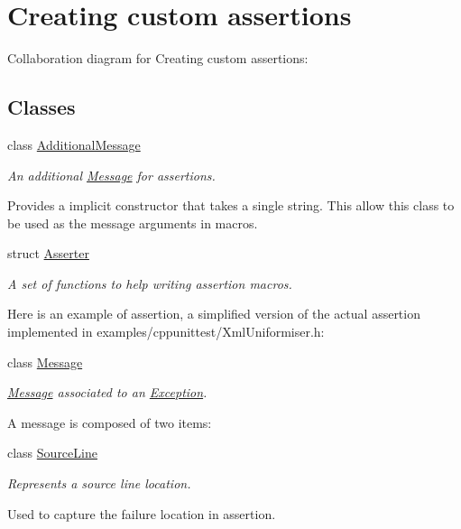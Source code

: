\hypertarget{group___creating_new_assertions}{\section{Creating custom assertions}
\label{group___creating_new_assertions}
}
Collaboration diagram for Creating custom assertions\+:
\subsection*{Classes}
\begin{DoxyCompactItemize}
\item 
class \hyperlink{class_additional_message}{Additional\+Message}
\begin{DoxyCompactList}\small\item\em An additional \hyperlink{class_message}{Message} for assertions.

Provides a implicit constructor that takes a single string. This allow this class to be used as the message arguments in macros. \end{DoxyCompactList}\item 
struct \hyperlink{struct_asserter}{Asserter}
\begin{DoxyCompactList}\small\item\em A set of functions to help writing assertion macros.

Here is an example of assertion, a simplified version of the actual assertion implemented in examples/cppunittest/\+Xml\+Uniformiser.\+h\+: \end{DoxyCompactList}\item 
class \hyperlink{class_message}{Message}
\begin{DoxyCompactList}\small\item\em \hyperlink{class_message}{Message} associated to an \hyperlink{class_exception}{Exception}.

A message is composed of two items\+: \end{DoxyCompactList}\item 
class \hyperlink{class_source_line}{Source\+Line}
\begin{DoxyCompactList}\small\item\em Represents a source line location.

Used to capture the failure location in assertion. \end{DoxyCompactList}\end{DoxyCompactItemize}
